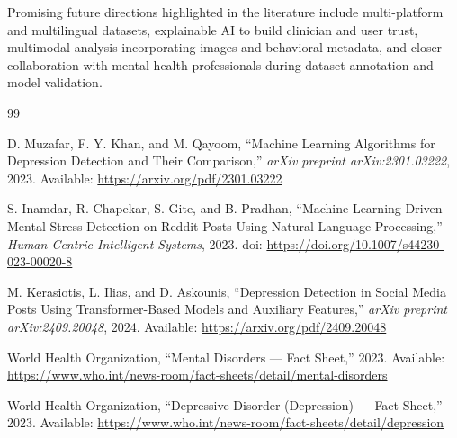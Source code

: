 \documentclass[a4paper,12pt]{article}
\begin{document}
Promising future directions highlighted in the literature include multi-platform and multilingual datasets, explainable AI to build clinician and user trust, multimodal analysis incorporating images and behavioral metadata, and closer collaboration with mental-health professionals during dataset annotation and model validation.



\clearpage
{}

\begin{thebibliography}{99}

D. Muzafar, F. Y. Khan, and M. Qayoom,
``Machine Learning Algorithms for Depression Detection and Their Comparison,''
\textit{arXiv preprint arXiv:2301.03222}, 2023.
Available: \url{https://arxiv.org/pdf/2301.03222}

S. Inamdar, R. Chapekar, S. Gite, and B. Pradhan,
``Machine Learning Driven Mental Stress Detection on Reddit Posts Using Natural Language Processing,''
\textit{Human-Centric Intelligent Systems}, 2023.
doi: \url{https://doi.org/10.1007/s44230-023-00020-8}

M. Kerasiotis, L. Ilias, and D. Askounis,
``Depression Detection in Social Media Posts Using Transformer-Based Models and Auxiliary Features,''
\textit{arXiv preprint arXiv:2409.20048}, 2024.
Available: \url{https://arxiv.org/pdf/2409.20048}

World Health Organization,
``Mental Disorders --- Fact Sheet,''
2023.
Available: \url{https://www.who.int/news-room/fact-sheets/detail/mental-disorders}

World Health Organization,
``Depressive Disorder (Depression) --- Fact Sheet,''
2023.
Available: \url{https://www.who.int/news-room/fact-sheets/detail/depression}

\end{thebibliography}
\end{document}
